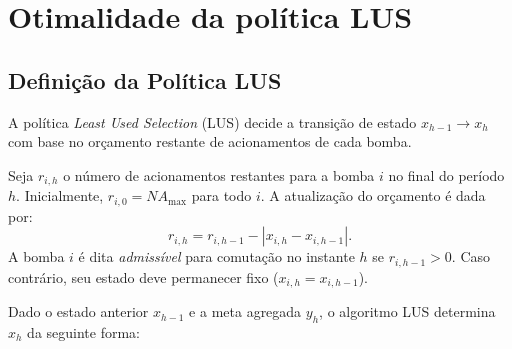 \documentclass{article}
\theoremstyle{definition}
\begin{document}
\section{Otimalidade da política LUS}

\newtheorem{theorem}{Teorema}

\subsection{Definição da Política LUS}

A política \emph{Least Used Selection} (LUS) decide a transição de estado $x_{h-1} \to x_h$ com base no orçamento restante de acionamentos de cada bomba.

Seja $r_{i,h}$ o número de acionamentos restantes para a bomba $i$ no final do período $h$. Inicialmente, $r_{i,0} = NA_{\max}$ para todo $i$. A atualização do orçamento é dada por:
\[
	r_{i,h} = r_{i,h-1} - |x_{i,h} - x_{i,h-1}|.
\]
A bomba $i$ é dita \emph{admissível} para comutação no instante $h$ se $r_{i,h-1} > 0$. Caso contrário, seu estado deve permanecer fixo ($x_{i,h} = x_{i,h-1}$).

Dado o estado anterior $x_{h-1}$ e a meta agregada $y_h$, o algoritmo LUS determina $x_h$ da seguinte forma:
\end{document}
